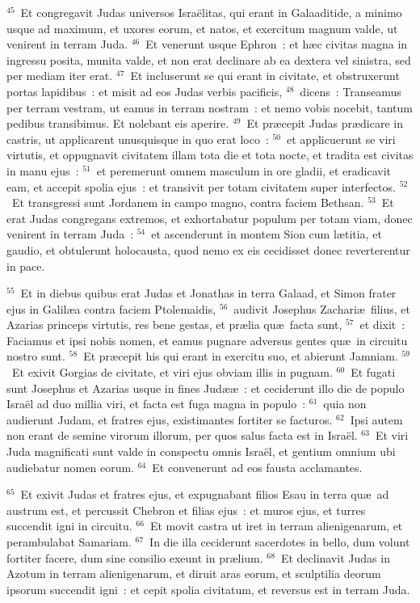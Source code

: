 ${}^{45}$~Et congregavit Judas universos Isra\"elitas, qui erant in Galaaditide, a minimo usque ad maximum, et uxores eorum, et natos, et exercitum magnum valde, ut venirent in terram Juda.
${}^{46}$~Et venerunt usque Ephron~: et h\ae c civitas magna in ingressu posita, munita valde, et non erat declinare ab ea dextera vel sinistra, sed per mediam iter erat.
${}^{47}$~Et incluserunt se qui erant in civitate, et obstruxerunt portas lapidibus~: et misit ad eos Judas verbis pacificis,
${}^{48}$~dicens~: Transeamus per terram vestram, ut eamus in terram nostram~: et nemo vobis nocebit, tantum pedibus transibimus. Et nolebant eis aperire.
${}^{49}$~Et pr\ae cepit Judas pr\ae dicare in castris, ut applicarent unusquisque in quo erat loco~:
${}^{50}$~et applicuerunt se viri virtutis, et oppugnavit civitatem illam tota die et tota nocte, et tradita est civitas in manu ejus~:
${}^{51}$~et peremerunt omnem masculum in ore gladii, et eradicavit eam, et accepit spolia ejus~: et transivit per totam civitatem super interfectos.
${}^{52}$~Et transgressi sunt Jordanem in campo magno, contra faciem Bethsan.
${}^{53}$~Et erat Judas congregans extremos, et exhortabatur populum per totam viam, donec venirent in terram Juda~:
${}^{54}$~et ascenderunt in montem Sion cum l\ae titia, et gaudio, et obtulerunt holocausta, quod nemo ex eis cecidisset donec reverterentur in pace.


${}^{55}$~Et in diebus quibus erat Judas et Jonathas in terra Galaad, et Simon frater ejus in Galil\ae a contra faciem Ptolemaidis,
${}^{56}$~audivit Josephus Zachari\ae\ filius, et Azarias princeps virtutis, res bene gestas, et pr\ae lia qu\ae\ facta sunt,
${}^{57}$~et dixit~: Faciamus et ipsi nobis nomen, et eamus pugnare adversus gentes qu\ae\ in circuitu nostro sunt.
${}^{58}$~Et pr\ae cepit his qui erant in exercitu suo, et abierunt Jamniam.
${}^{59}$~Et exivit Gorgias de civitate, et viri ejus obviam illis in pugnam.
${}^{60}$~Et fugati sunt Josephus et Azarias usque in fines Jud\ae \ae~: et ceciderunt illo die de populo Isra\"el ad duo millia viri, et facta est fuga magna in populo~:
${}^{61}$~quia non audierunt Judam, et fratres ejus, existimantes fortiter se facturos.
${}^{62}$~Ipsi autem non erant de semine virorum illorum, per quos salus facta est in Isra\"el.
${}^{63}$~Et viri Juda magnificati sunt valde in conspectu omnis Isra\"el, et gentium omnium ubi audiebatur nomen eorum.
${}^{64}$~Et convenerunt ad eos fausta acclamantes.


${}^{65}$~Et exivit Judas et fratres ejus, et expugnabant filios Esau in terra qu\ae\ ad austrum est, et percussit Chebron et filias ejus~: et muros ejus, et turres succendit igni in circuitu.
${}^{66}$~Et movit castra ut iret in terram alienigenarum, et perambulabat Samariam.
${}^{67}$~In die illa ceciderunt sacerdotes in bello, dum volunt fortiter facere, dum sine consilio exeunt in pr\ae lium.
${}^{68}$~Et declinavit Judas in Azotum in terram alienigenarum, et diruit aras eorum, et sculptilia deorum ipsorum succendit igni~: et cepit spolia civitatum, et reversus est in terram Juda.

